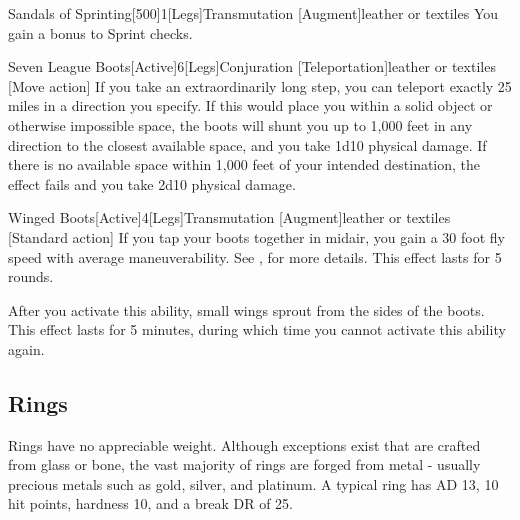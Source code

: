        \begin{magicitemdef}{Sandals of Sprinting}[500]{1}[Legs]{Transmutation [Augment]}{leather or textiles}
             You gain a  bonus to Sprint checks.
        \end{magicitemdef}

        \begin{magicitemdef}{Seven League Boots}[Active]{6}[Legs]{Conjuration [Teleportation]}{leather or textiles}
            [Move action] If you take an extraordinarily long step, you can teleport exactly 25 miles in a direction you specify.
            If this would place you within a solid object or otherwise impossible space, the boots will shunt you up to 1,000 feet in any direction to the closest available space, and you take 1d10 physical damage.
            If there is no available space within 1,000 feet of your intended destination, the effect fails and you take 2d10 physical damage.
        \end{magicitemdef}

        \begin{magicitemdef}{Winged Boots}[Active]{4}[Legs]{Transmutation [Augment]}{leather or textiles}
            [Standard action] If you tap your boots together in midair, you gain a 30 foot fly speed with average maneuverability.
            See , for more details.
            This effect lasts for 5 rounds.

            After you activate this ability, small wings sprout from the sides of the boots.
            This effect lasts for 5 minutes, during which time you cannot activate this ability again.
        \end{magicitemdef}

    \subsection{Rings}

         Rings have no appreciable weight.
        Although exceptions exist that are crafted from glass or bone, the vast majority of rings are forged from metal - usually precious metals such as gold, silver, and platinum.
        A typical ring has AD 13, 10 hit points, hardness 10, and a break DR of 25.

